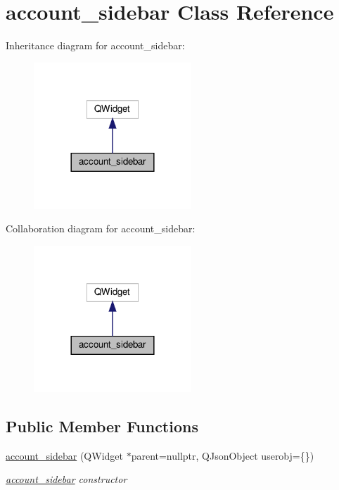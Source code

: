 \hypertarget{classaccount__sidebar}{}\section{account\+\_\+sidebar Class Reference}
\label{classaccount__sidebar}


Inheritance diagram for account\+\_\+sidebar\+:
\nopagebreak
\begin{figure}[H]
\begin{center}
\leavevmode
\includegraphics[width=168pt]{classaccount__sidebar__inherit__graph}
\end{center}
\end{figure}


Collaboration diagram for account\+\_\+sidebar\+:
\nopagebreak
\begin{figure}[H]
\begin{center}
\leavevmode
\includegraphics[width=168pt]{classaccount__sidebar__coll__graph}
\end{center}
\end{figure}
\subsection*{Public Member Functions}
\begin{DoxyCompactItemize}
\item 
\hyperlink{classaccount__sidebar_a6fa648be2eabdef0be7b5f27a16ac7f1}{account\+\_\+sidebar} (Q\+Widget $\ast$parent=nullptr, Q\+Json\+Object userobj=\{\})
\begin{DoxyCompactList}\small\item\em \hyperlink{classaccount__sidebar}{account\+\_\+sidebar} constructor \end{DoxyCompactList}\end{DoxyCompactItemize}


